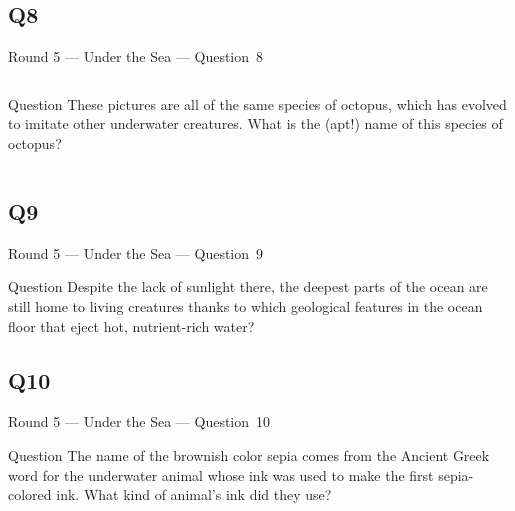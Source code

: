 \documentclass[11pt,draft]{beamer}
\begin{document}
\subsection*{Q8}
\begin{frame}[t]{Round 5 --- Under the Sea --- \mbox{Question 8}}
    \begin{columns}[T,totalwidth=\linewidth]
        \begin{column}{0.32\linewidth}
            \begin{block}{Question}
                These pictures are all of the same species of octopus, which has evolved to imitate other underwater creatures. What is the (apt!) name of this species of octopus?
            \end{block}
        \end{column}
        \begin{column}{0.65\linewidth}
            \begin{center}
                \texttt{[image: \{Images/mimic]}.jpg}
            \end{center}
        \end{column}
    \end{columns}
\end{frame}
\subsection*{Q9}
\begin{frame}[t]{Round 5 --- Under the Sea --- \mbox{Question 9}}
    \begin{block}{Question}
        Despite the lack of sunlight there, the deepest parts of the ocean are still home to living creatures thanks to which geological features in the ocean floor that eject hot, nutrient-rich water?
    \end{block}
\end{frame}
\subsection*{Q10}
\begin{frame}[t]{Round 5 --- Under the Sea --- \mbox{Question 10}}
    \begin{block}{Question}
        The name of the brownish color sepia comes from the Ancient Greek word for the underwater animal whose ink was used to make the first sepia-colored ink. What kind of animal's ink did they use?
    \end{block}
\end{frame}
\end{document}
